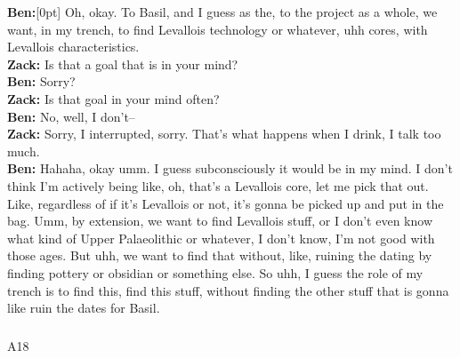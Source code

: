 \documentclass[
]{article}
\makeatletter
\let\oldsubparagraph\subparagraph
\renewcommand{\subparagraph}{
    \@ifstar
      \xxxSubParagraphStar
      \xxxSubParagraphNoStar
  }
\newcommand{\xxxSubParagraphStar}[1]{\oldsubparagraph*{#1}\mbox{}}
\newcommand{\xxxSubParagraphNoStar}[1]{\oldsubparagraph{#1}\mbox{}}
\newcommand{\paragraphnumber}[1]{\marginnote{\color{lightgray}\tiny{#1}}[0pt]}
\makeatother
\begin{document}
\textbf{Ben:}\paragraphnumber{[111]} Oh, okay. To Basil, and I guess as
the, to the project as a whole, we want, in my trench, to find Levallois
technology or whatever, uhh cores, with Levallois characteristics.\\
\textbf{Zack:} Is that a goal that is in your mind?\\
\textbf{Ben:} Sorry?\\
\textbf{Zack:} Is that goal in your mind often?\\
\textbf{Ben:} No, well, I don't--\\
\textbf{Zack:} Sorry, I interrupted, sorry. That's what happens when I
drink, I talk too much.\\
\textbf{Ben:} Hahaha, okay umm. I guess subconsciously it would be in my
mind. I don't think I'm actively being like, oh, that's a Levallois
core, let me pick that out. Like, regardless of if it's Levallois or
not, it's gonna be picked up and put in the bag. Umm, by extension, we
want to find Levallois stuff, or I don't even know what kind of Upper
Palaeolithic or whatever, I don't know, I'm not good with those ages.
But uhh, we want to find that without, like, ruining the dating by
finding pottery or obsidian or something else. So uhh, I guess the role
of my trench is to find this, find this stuff, without finding the other
stuff that is gonna like ruin the dates for Basil.

\subparagraph{A18}\label{sec-A18}
\end{document}
